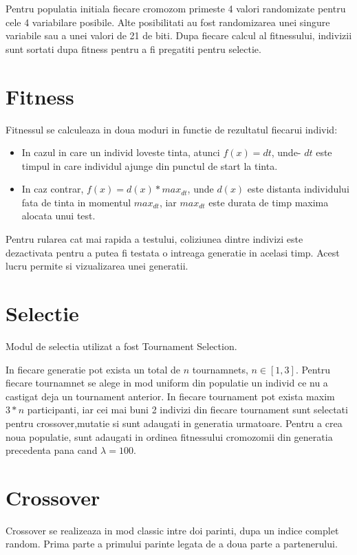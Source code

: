 Pentru populatia initiala fiecare cromozom primeste 4 valori randomizate pentru cele 4 variabilare posibile. Alte posibilitati au fost randomizarea unei singure variabile sau a unei valori de 21 de biti. Dupa fiecare calcul al fitnessului, indivizii sunt sortati dupa fitness pentru a fi pregatiti pentru selectie. 
\section{Fitness}

Fitnessul se calculeaza in doua moduri in functie de rezultatul fiecarui individ:
\begin{itemize}
    \item In cazul in care un individ loveste tinta, atunci $f(x) = dt$, unde- $dt$ este timpul in care individul ajunge din punctul de start la tinta.
    \item In caz contrar, $f(x) = d(x) * max_{dt}$, unde $d(x)$ este distanta individului fata de tinta in momentul $max_{dt}$, iar $max_{dt}$ este durata de timp maxima alocata unui test.
\end{itemize}  

Pentru rularea cat mai rapida a testului, coliziunea dintre indivizi este dezactivata pentru a putea fi testata o intreaga generatie in acelasi timp. Acest lucru permite si vizualizarea unei generatii.

\section{Selectie}
 
Modul de selectia utilizat a fost Tournament Selection.

In fiecare generatie pot exista un total de $n$ tournamnets, $n \in [1,3]$. Pentru fiecare tournamnet se alege in mod uniform din populatie un individ ce nu a castigat deja un tournament anterior. In fiecare tournament pot exista maxim $3*n$ participanti, iar cei mai buni 2 indivizi din fiecare tournament sunt selectati pentru crossover,mutatie si sunt adaugati in generatia urmatoare. Pentru a crea noua populatie, sunt adaugati in ordinea fitnessului cromozomii din generatia precedenta pana cand $\lambda = 100$.

\section{Crossover}
Crossover se realizeaza in mod classic intre doi parinti, dupa un indice complet random. Prima parte a primului parinte legata de a doua parte a partenerului.

